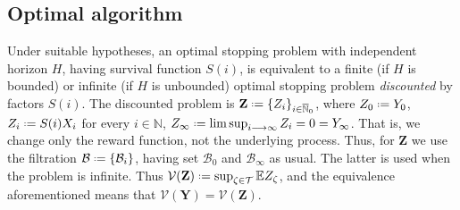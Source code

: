 \documentclass[11pt, a4paper, twoside]{article}
\newcommand*{\defeq}{\mathrel{\vcenter{\baselineskip0.5ex \lineskiplimit0pt
			\hbox{\scriptsize.}\hbox{\scriptsize.}}}=}
\newcommand{\NN}{\mathbb{N}}
\newcommand{\NNN}{\overline{\mathbb{N}}}
\newcommand{\EE}{\mathbb{E}}
\newcommand{\TT}{\mathcal{T}}
\newcommand{\Val}{\mathcal{V}}
\newcommand{\YY}{\mathbf{Y}}
\newcommand{\DZ}{\mathbf{Z}}
\newcommand{\DF}{\mathcal{B}}
\numberwithin{equation}{section}
\begin{document}
	\subsection{Optimal algorithm}
	Under suitable hypotheses, an optimal stopping problem with independent horizon $H$, having survival function $S(i)$, is equivalent to a finite (if $H$ is bounded) or infinite (if $H$ is unbounded) optimal stopping problem \textit{discounted} by factors $S(i)$. The discounted problem is $\DZ\defeq\{Z_i\}_{i\in\NNN_0}$, where $Z_0\defeq Y_0$, $Z_i\defeq S(i)X_i$ for every $i\in\NN$, $Z_\infty\defeq\limsup_{i\longrightarrow\infty} Z_i=0=Y_\infty$. That is, we change only the reward function, not the underlying process. Thus, for $\DZ$ we use the filtration $\DF\defeq\{\DF_i\}$, having set $\DF_0$ and $\DF_\infty$ as usual. The latter is used when the problem is infinite. Thus $\Val(\DZ)\defeq\sup_{\zeta\in\TT}\EE Z_\zeta$, and the equivalence aforementioned means that $\Val(\YY)=\Val(\DZ)$. 
\end{document}

